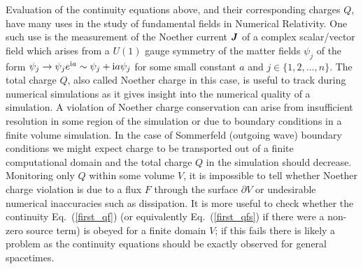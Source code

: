 Evaluation of the continuity equations above, and their corresponding charges ${Q}$, have many uses in the study of fundamental fields in Numerical Relativity. One such use is the measurement of the Noether current $\boldsymbol{J}$ of a complex scalar/vector field which arises from a $U(1)$ gauge symmetry of the matter fields $\psi_j$ of the form $\psi_j \rightarrow \psi_j e^{\mathrm{i}a} \sim \psi_j + 
{\rm i} a \psi_j$ for some small constant $a$ and $j \in \{1,2,...,n\}$. The total charge $Q$, also called Noether charge in this case, is useful to track during numerical simulations as it gives insight into the numerical quality of a simulation. A violation of Noether charge conservation can arise from insufficient resolution in some region of the simulation or due to boundary conditions in a finite volume simulation. In the case of Sommerfeld (outgoing wave) boundary conditions \cite{Alcubierre:2002kk} we might expect charge to be transported out of a finite computational domain and the total charge $Q$ in the simulation should decrease. Monitoring only ${Q}$ within some volume $V$, it is impossible to tell whether Noether charge violation is due to a flux ${F}$ through the surface $\partial V$ or undesirable numerical inaccuracies such as dissipation. It is more useful to check whether the continuity Eq.~(\ref{first_qf}) (or equivalently Eq.~(\ref{first_qfs}) if there were a non-zero source term) is obeyed for a finite domain $V$; if this fails there is likely a problem as the continuity equations should be exactly observed for general spacetimes. 

